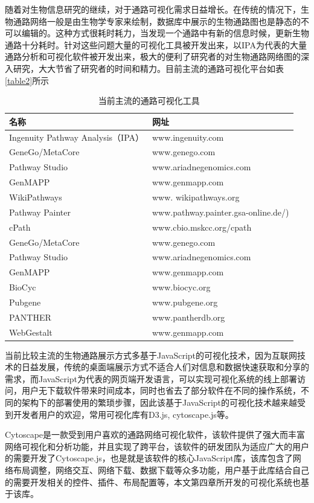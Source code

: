 随着对生物信息研究的继续，对于通路可视化需求日益增长。在传统的情况下，生物通路网络一般是由生物学专家来绘制，数据库中展示的生物通路图也是静态的不可以编辑的。这种方式很耗时耗力，当发现一个通路中有新的信息时候，更新生物通路十分耗时。针对这些问题大量的可视化工具被开发出来，以IPA为代表的大量通路分析和可视化软件被开发出来，极大的便利了研究者的对生物通路网络图的深入研究，大大节省了研究者的时间和精力。目前主流的通路可视化平台如表\ref{table2}所示

\begin{table}[htbp]
  \centering
	\caption[table2]{当前主流的通路可视化工具}
\vspace{0.5em}\wuhao
\begin{tabularx}{1.0\textwidth}{lX}
\toprule[1.5pt]
名称 & 网址 \\
\midrule[1pt]
Ingenuity Pathway Analysis（IPA）	& www.ingenuity.com\\
GeneGo/MetaCore 	& www.genego.com\\
Pathway Studio 	& www.ariadnegenomics.com\\
GenMAPP	       & www.genmapp.com\\
WikiPathways & www. wikipathways.org\\
Pathway Painter	 & www.pathway.painter.gsa-online.de/)\\
cPath	& www.cbio.mskcc.org/cpath\\
GeneGo/MetaCore 	& www.genego.com\\
Pathway Studio 	& www.ariadnegenomics.com\\
GenMAPP	& www.genmapp.com\\
BioCyc	& www.biocyc.org\\
Pubgene	& www.pubgene.org\\
PANTHER	& www.pantherdb.org\\
WebGestalt	& www.genmapp.com\\

\bottomrule[1.5pt]
\end{tabularx}
\end{table}

当前比较主流的生物通路展示方式多基于JavaScript的可视化技术，因为互联网技术的日益发展，传统的桌面端展示方式不适合人们对信息和数据快速获取和分享的需求，而JavaScript为代表的网页端开发语言，可以实现可视化系统的线上部署访问，用户无下载软件带来时间成本，同时也省去了部分软件在不同的操作系统，不同的架构下的部署使用的繁琐步骤，因此该基于JavaScript的可视化技术越来越受到开发者用户的欢迎，常用可视化库有D3.js, cytoscape.js等。


Cytoscape\cite{}是一款受到用户喜欢的通路网络可视化软件，该软件提供了强大而丰富网络可视化和分析功能，并且实现了跨平台，该软件的研发团队为适应广大的用户的需要开发了Cytoscape.js，也是就是该软件的核心JavaScript库，该库包含了网络布局调整，网络交互、网络下载、数据下载等众多功能，用户基于此库结合自己的需要开发相关的控件、插件、布局配置等，本文第四章所开发的可视化系统也基于该库。


